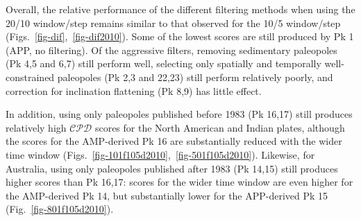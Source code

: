 Overall, the relative performance of the different filtering methods when using
the 20/10 window/step remains similar to that observed for the 10/5 window/step
(Figs.~\ref{fig-dif},~\ref{fig-dif2010}). Some of the lowest scores are still
produced by Pk 1 (APP, no filtering). Of the aggressive filters, removing
sedimentary paleopoles (Pk 4,5 and 6,7) still perform well, selecting only
spatially and temporally well-constrained paleopoles (Pk 2,3 and 22,23) still
perform relatively poorly, and correction for inclination flattening (Pk 8,9)
has little effect.

In addition, using only paleopoles published before 1983 (Pk 16,17) still
produces relatively high $\mathcal{CPD}$ scores for the North American and
Indian plates, although the scores for the AMP-derived Pk 16 are substantially
reduced with the wider time window (Figs.~\ref{fig-101f105d2010},~\ref{fig-501f105d2010}).
Likewise, for Australia, using only paleopoles published after 1983 (Pk 14,15)
still produces higher scores than Pk 16,17: scores for the wider time window are
even higher for the AMP-derived Pk 14, but substantially lower for the
APP-derived Pk 15 (Fig.~\ref{fig-801f105d2010}).

